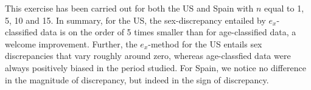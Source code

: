 This exercise has been carried out for both the US and Spain with $n$ equal to
1, 5, 10 and 15. In summary, for the US, the sex-discrepancy entailed by
$e_x$-classified data is on the order of 5 times smaller than for age-classified
data, a welcome improvement. Further, the $e_x$-method for the US entails sex
discrepancies that vary roughly around zero, whereas age-classfied data were
always positively biased in the period studied. For Spain, we notice no
difference in the magnitude of discrepancy, but indeed in the sign of
discrepancy.









